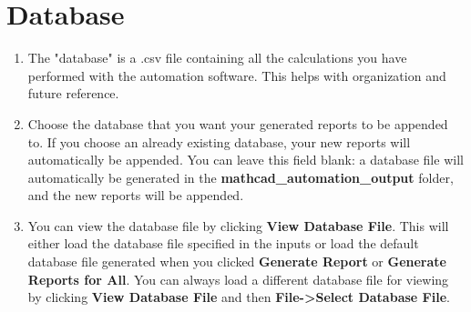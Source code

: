 \documentclass[11pt]{article}
\begin{document}
\section{Database}
\label{sec:org485c4d4}
\begin{enumerate}
\item The "database" is a .csv file containing all the calculations you have performed with the automation software. This helps with organization and future reference.
\item Choose the database that you want your generated reports to be appended to. If you choose an already existing database, your new reports will automatically be appended. You can leave this field blank: a database file will automatically be generated in the \textbf{mathcad\_automation\_output} folder, and the new reports will be appended.
\item You can view the database file by clicking \textbf{View Database File}. This will either load the database file specified in the inputs or load the default database file generated when you clicked \textbf{Generate Report} or \textbf{Generate Reports for All}. You can always load a different database file for viewing by clicking \textbf{View Database File} and then \textbf{File->Select Database File}.
\end{enumerate}
\end{document}
